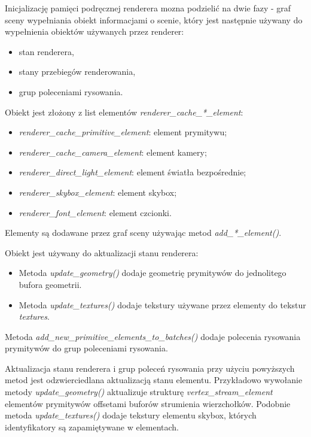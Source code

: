 Inicjalizację pamięci podręcznej renderera mozna podzielić na dwie fazy - graf sceny wypełniania obiekt informacjami o scenie, który jest następnie używany do wypełnienia obiektów używanych przez renderer:
\begin{itemize}
	\item stan renderera,
	\item stany przebiegów renderowania,
	\item grup poleceniami rysowania.
\end{itemize}

Obiekt jest złożony z list elementów \textit{renderer\_cache\_*\_element}:
\begin{itemize}
	\item \textit{renderer\_cache\_primitive\_element}: element prymitywu;
	\item \textit{renderer\_cache\_camera\_element}: element kamery;
	\item \textit{renderer\_direct\_light\_element}: element światła bezpośrednie;
	\item \textit{renderer\_skybox\_element}: element skybox;
	\item \textit{renderer\_font\_element}: element czcionki.
\end{itemize}
Elementy są dodawane przez graf sceny używając metod \textit{add\_*\_element()}.

Obiekt jest używany do aktualizacji stanu renderera:
\begin{itemize}
	\item Metoda \textit{update\_geometry()} dodaje geometrię prymitywów do jednolitego bufora geometrii.
	\item Metoda \textit{update\_textures()} dodaje tekstury używane przez elementy do tekstur \textit{textures}.
\end{itemize}

\item Metoda \textit{add\_new\_primitive\_elements\_to\_batches()} dodaje polecenia rysowania prymitywów do grup poleceniami rysowania.

Aktualizacja stanu renderera i grup poleceń rysowania przy użyciu powyższych metod jest odzwierciedlana aktualizacją stanu elementu.
Przykładowo wywołanie metody \textit{update\_geometry()} aktualizuje strukturę \textit{vertex\_stream\_element} elementów prymitywów offsetami buforów strumienia wierzchołków.
Podobnie metoda \textit{update\_textures()} dodaje tekstury elementu skybox, których identyfikatory są zapamiętywane w elementach.


